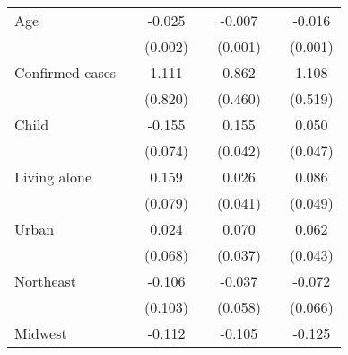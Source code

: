 {\begin{tabular}{l*{6}{c}}
\addlinespace
Age                 &                     &      -0.025\sym{***}&                     &      -0.007\sym{***}&                     &      -0.016\sym{***}\\
                    &                     &     (0.002)         &                     &     (0.001)         &                     &     (0.001)         \\
\addlinespace
Confirmed cases     &                     &       1.111         &                     &       0.862\sym{*}  &                     &       1.108\sym{**} \\
                    &                     &     (0.820)         &                     &     (0.460)         &                     &     (0.519)         \\
\addlinespace
Child               &                     &      -0.155\sym{**} &                     &       0.155\sym{***}&                     &       0.050         \\
                    &                     &     (0.074)         &                     &     (0.042)         &                     &     (0.047)         \\
\addlinespace
Living alone        &                     &       0.159\sym{**} &                     &       0.026         &                     &       0.086\sym{*}  \\
                    &                     &     (0.079)         &                     &     (0.041)         &                     &     (0.049)         \\
\addlinespace
Urban               &                     &       0.024         &                     &       0.070\sym{*}  &                     &       0.062         \\
                    &                     &     (0.068)         &                     &     (0.037)         &                     &     (0.043)         \\
\addlinespace
Northeast           &                     &      -0.106         &                     &      -0.037         &                     &      -0.072         \\
                    &                     &     (0.103)         &                     &     (0.058)         &                     &     (0.066)         \\
\addlinespace
Midwest             &                     &      -0.112         &                     &      -0.105\sym{**} &                     &      -0.125\sym{**} \\

\end{tabular}}
